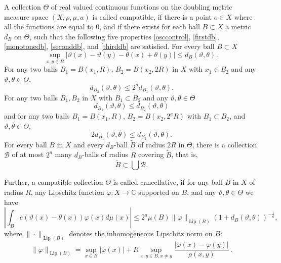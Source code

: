 \documentclass[10pt,a4paper]{article}
\theoremstyle{plain}
\theoremstyle{definition}
\numberwithin{equation}{subsection}
\DeclareMathOperator{\Lip}{\operatorname{Lip}}
\newcommand{\mfa}{{\vartheta}}
\newcommand{\mfb}{{\theta}}
\newcommand{\Mf}{{\Theta}}
\def\C{\mathbb{C}}
\begin{document}
A collection $\Mf$ of real valued continuous functions on the doubling metric measure space $(X,\rho,\mu,a)$ is called compatible,
if there is a point $o\in X$ where all the functions are equal to $0$,
and if there exists for each ball $B \subset X$ a metric $d_B$ on $\Mf$,
such that the following five properties \eqref{osccontrol}, \eqref{firstdb}, \eqref{monotonedb}, \eqref{seconddb}, and \eqref{thirddb} are satisfied.
For every ball $B \subset X$
\begin{equation}\label{osccontrol}
    \sup_{x,y\in B}|\mfa(x)-{\mfa(y)}- \mfb(x)+{\mfb(y)}| \le d_{B}(\mfa,\mfb)\,.
\end{equation}
For any two balls $B_1=B(x_1,R)$, $B_2= B(x_2,2R)$ in $X$ with $x_1\in B_2$ and any $\mfa,\mfb\in \Mf$,
\begin{equation}\label{firstdb}
    d_{B_2}(\mfa,\mfb)\le 2^a d_{B_1}(\mfa,\mfb) .
\end{equation}
For any two balls $B_1, B_2$ in $X$ with $B_1 \subset B_2$ and any $\mfa, \mfb \in \Mf$
\begin{equation}\label{monotonedb}
    d_{B_1}(\mfa,\mfb) \le d_{B_2}(\mfa, \mfb)
\end{equation}
and for any two balls
$B_1=B(x_1,R)$, $B_2= B(x_2,2^aR)$
with $B_1\subset B_2$, and $\mfa,\mfb\in \Mf$,
\begin{equation}\label{seconddb}
    2d_{B_1}(\mfa,\mfb)
\le d_{B_2}(\mfa,\mfb) .
\end{equation}
For every ball $B$ in $X$ and every $d_B$-ball $\tilde B$ of radius $2R$ in $\Mf$, there is a collection $\mathcal{B}$ of
at most $2^a$ many $d_B$-balls of radius $R$ covering $\tilde B$, that is,
\begin{equation}\label{thirddb}
    \tilde B\subset \bigcup \mathcal{B}.
\end{equation}


Further, a compatible collection $\Mf$ is called cancellative, if
for any ball $B$ in $X$ of radius $R$, any Lipschitz function $\varphi: X\to \C$
supported on $B$, and any $\mfa,\mfb\in \Mf$ we have
\begin{equation}
    \label{eq-vdc-cond}
    |\int_B e(\mfa(x)-{\mfb(x)}) \varphi(x) d\mu(x)|\le 2^a \mu(B)\|\varphi\|_{\Lip(B)}
(1+d_B(\mfa,\mfb))^{-\frac{1}{a}},
\end{equation}
where $\|\cdot\|_{\Lip(B)}$ denotes the inhomogeneous Lipschitz norm on $B$:
$$
    \|\varphi\|_{\Lip(B)} = \sup_{x \in B} |\varphi(x)| + R \sup_{x,y \in B, x \neq y} \frac{|\varphi(x) - \varphi(y)|}{\rho(x,y)}\,.
$$
\end{document}

